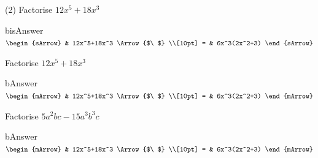 \clearpage\noindent%


\begin{mtask}(2)
    \task Factorise $12x^5+18x^3$
              \begin{envOut}[equal height group=A-Rev-1]{bisAnswer}
			       $\begin{sArrow}
			             & 12x^5+18x^3    \Arrow{$\ $} \\[10pt]
                       = & 6x^3(2x^2+3)              
	                \end{sArrow}$
              \end{envOut}
    \task Factorise $12x^5+18x^3$
              \begin{envOut}[equal height group=A-Rev-1]{bAnswer}
			       $\begin{mArrow}
			             & 12x^5+18x^3    \Arrow{$\ $} \\[10pt]
                       = & 6x^3(2x^2+3)              
	                \end{mArrow}$
              \end{envOut}
    \task Factorise $5a^2bc - 15a^3b^3c$
              \begin{envOut}[equal height group=A-Rev-1]{bAnswer}
			       $\begin{mArrow}
			             & 12x^5+18x^3    \Arrow{$\ $} \\[10pt]
                       = & 6x^3(2x^2+3)              
	                \end{mArrow}$
              \end{envOut}
\end{mtask}


